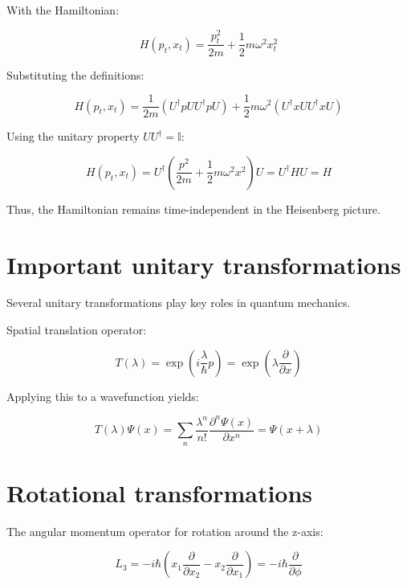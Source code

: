 With the Hamiltonian:

\begin{equation}
H\left(p_{t}, x_{t}\right)=\frac{p_{t}^{2}}{2 m}+\frac{1}{2} m \omega^{2} x_{t}^{2}
\end{equation}

Substituting the definitions:

\begin{equation}
H\left(p_{t}, x_{t}\right)=\frac{1}{2 m}\left(U^{\dagger} p U U^{\dagger} p U\right) + \frac{1}{2} m \omega^{2}\left(U^{\dagger} x U U^{\dagger} x U\right)
\end{equation}

Using the unitary property $U U^{\dagger}=\mathbb{I}$:

\begin{equation}
H\left(p_{t}, x_{t}\right)=U^{\dagger}\left(\frac{p^{2}}{2 m}+\frac{1}{2} m \omega^{2} x^{2}\right) U=U^{\dagger} H U=H
\end{equation}

Thus, the Hamiltonian remains time-independent in the Heisenberg picture.

\section{Important unitary transformations}
Several unitary transformations play key roles in quantum mechanics.

Spatial translation operator:

\begin{equation}
T(\lambda)=\exp \left(i \frac{\lambda}{\hbar} p\right)=\exp \left(\lambda \frac{\partial}{\partial x}\right)
\end{equation}

Applying this to a wavefunction yields:

\begin{equation}
T(\lambda) \Psi(x)=\sum_{n} \frac{\lambda^{n}}{n!} \frac{\partial^{n} \Psi(x)}{\partial x^{n}}=\Psi(x+\lambda)
\end{equation}
\section{Rotational transformations}

The angular momentum operator for rotation around the z-axis:

\begin{equation}
L_{3}=-i \hbar\left(x_{1} \frac{\partial}{\partial x_{2}}-x_{2} \frac{\partial}{\partial x_{1}}\right)=-i \hbar \frac{\partial}{\partial \phi}
\end{equation}


